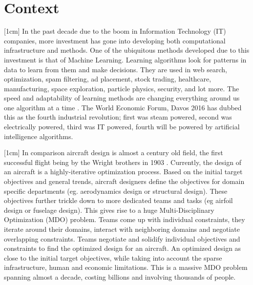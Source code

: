 \chapter{Context}
\label{chapIntroduction}

[1cm]
In the past decade due to the boom in Information Technology (IT) companies, more investment has gone into developing both computational infrastructure and methods. One of the ubiquitous methods developed due to this investment is that of Machine Learning. Learning algorithms look for patterns in data to learn from them and make decisions. They are used in web search, optimization, spam filtering, ad placement, stock trading, healthcare, manufacturing, space exploration, particle physics, security, and lot more. The speed and adaptability of learning methods are changing everything around us one algorithm at a time \cite{domingos2015master}. The World Economic Forum, Davos 2016 \cite{schwab2016fourth} has dubbed this as the fourth industrial revolution; first was steam powered, second was electrically powered, third was IT powered, fourth will be powered by artificial intelligence algorithms.

[1cm]
In comparison aircraft design is almost a century old field, the first successful flight being by the Wright brothers in 1903 \cite{wright1934we}. Currently, the design of an aircraft is a highly-iterative optimization process. Based on the initial target objectives and general trends, aircraft designers define the objectives for domain specific departments (eg. aerodynamics design or structural design). These objectives further trickle down to more dedicated teams and tasks (eg airfoil design or fuselage design). This gives rise to a huge Multi-Disciplinary Optimization (MDO) problem. Teams come up with individual constraints, they iterate around their domains, interact with neighboring domains and negotiate overlapping constraints. Teams negotiate and solidify individual objectives and constraints to find the optimized design for an aircraft. An optimized design as close to the initial target objectives, while taking into account the sparse infrastructure, human and economic limitations. This is a massive MDO problem spanning almost a decade, costing billions and involving thousands of people. 

